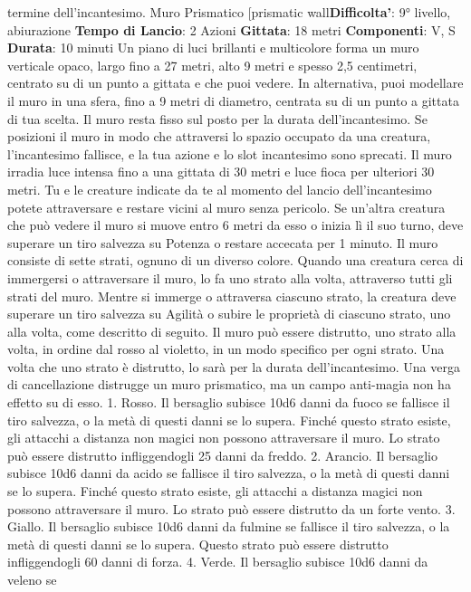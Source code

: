 \begin{multicols}{2}
termine dell’incantesimo.
Muro Prismatico
[prismatic wall\textbf{Difficolta'}:
9° livello, abiurazione
\textbf{Tempo di Lancio}: 2 Azioni
\textbf{Gittata}: 18 metri
\textbf{Componenti}: V, S
\textbf{Durata}: 10 minuti
Un piano di luci brillanti e multicolore forma un muro
verticale opaco, largo fino a 27 metri, alto 9 metri e
spesso 2,5 centimetri, centrato su di un punto a gittata
e che puoi vedere. In alternativa, puoi modellare il muro
in una sfera, fino a 9 metri di diametro, centrata su di un
punto a gittata di tua scelta. Il muro resta fisso sul posto
per la durata dell’incantesimo. Se posizioni il muro in
modo che attraversi lo spazio occupato da una
creatura, l’incantesimo fallisce, e la tua azione e lo slot
incantesimo sono sprecati.
Il muro irradia luce intensa fino a una gittata di 30 metri
e luce fioca per ulteriori 30 metri. Tu e le creature
indicate da te al momento del lancio dell’incantesimo
potete attraversare e restare vicini al muro senza
pericolo. Se un’altra creatura che può vedere il muro si
muove entro 6 metri da esso o inizia lì il suo turno, deve
superare un tiro salvezza su Potenza o restare
accecata per 1 minuto.
Il muro consiste di sette strati, ognuno di un diverso
colore. Quando una creatura cerca di immergersi o
attraversare il muro, lo fa uno strato alla volta,
attraverso tutti gli strati del muro. Mentre si immerge o
attraversa ciascuno strato, la creatura deve superare un
tiro salvezza su Agilità o subire le proprietà di
ciascuno strato, uno alla volta, come descritto di
seguito.
Il muro può essere distrutto, uno strato alla volta, in
ordine dal rosso al violetto, in un modo specifico per
ogni strato. Una volta che uno strato è distrutto, lo sarà
per la durata dell’incantesimo. Una verga di
cancellazione distrugge un muro prismatico, ma un
campo anti-magia non ha effetto su di esso.
1. Rosso. Il bersaglio subisce 10d6 danni da fuoco se
fallisce il tiro salvezza, o la metà di questi danni se lo
supera. Finché questo strato esiste, gli attacchi a
distanza non magici non possono attraversare il muro. 
Lo strato può essere distrutto infliggendogli 25 danni da
freddo.
2. Arancio. Il bersaglio subisce 10d6 danni da acido se
fallisce il tiro salvezza, o la metà di questi danni se lo
supera. Finché questo strato esiste, gli attacchi a
distanza magici non possono attraversare il muro. Lo
strato può essere distrutto da un forte vento.
3. Giallo. Il bersaglio subisce 10d6 danni da fulmine se
fallisce il tiro salvezza, o la metà di questi danni se lo
supera. Questo strato può essere distrutto infliggendogli
60 danni di forza.
4. Verde. Il bersaglio subisce 10d6 danni da veleno se

\end{multicols}
